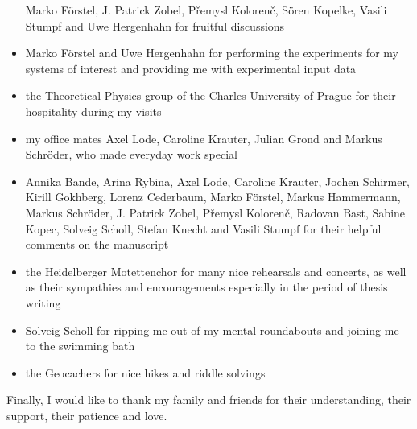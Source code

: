 \begin{itemize}
       Marko Förstel, J. Patrick Zobel,
       P\v{r}emysl Koloren\v{c},
       Sören Kopelke, Vasili Stumpf and Uwe Hergenhahn for fruitful discussions
 \item Marko Förstel and Uwe Hergenhahn for performing the experiments
       for my systems of interest and providing me with experimental input data
 \item the Theoretical Physics group of the Charles University of Prague for
       their hospitality during my visits
 \item my office mates Axel Lode, Caroline Krauter, Julian Grond and Markus
       Schröder, who made everyday work special
 \item Annika Bande, Arina Rybina, Axel Lode, Caroline Krauter, Jochen Schirmer,
       Kirill Gokhberg, Lorenz Cederbaum, Marko Förstel, Markus Hammermann,
       Markus Schröder, J. Patrick Zobel, P\v{r}emysl Koloren\v{c},
       Radovan Bast, Sabine Kopec, Solveig Scholl, Stefan Knecht
       and Vasili Stumpf for their helpful comments on the manuscript
 \item the Heidelberger Motettenchor for many nice rehearsals and concerts,
       as well as their sympathies and encouragements especially in the period
       of thesis writing
 \item Solveig Scholl for ripping me out of my mental roundabouts and
       joining me to the swimming bath
 \item the Geocachers for nice hikes and riddle solvings
\end{itemize}

Finally, I would like to thank my family and friends for their understanding,
their support, their patience and love.
